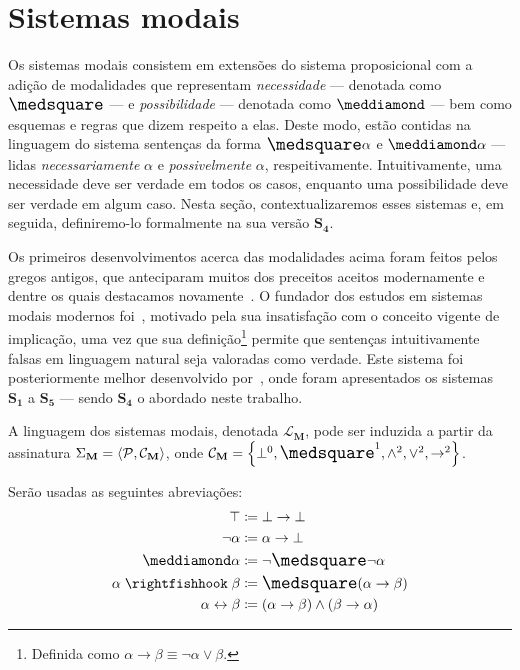 \section{Sistemas modais}
    Os sistemas modais consistem em extensões do sistema proposicional com a adição de modalidades que representam \emph{necessidade} --- denotada como $\nec$ --- e \emph{possibilidade} --- denotada como $\pos$ --- bem como esquemas e regras que dizem respeito a elas. Deste modo, estão contidas na linguagem do sistema sentenças da forma $\nec\alpha$ e $\pos\alpha$ --- lidas \emph{necessariamente} $\alpha$ e \emph{possivelmente} $\alpha$, respeitivamente. Intuitivamente, uma necessidade deve ser verdade em todos os casos, enquanto uma possibilidade deve ser verdade em algum caso. Nesta seção, contextualizaremos esses sistemas e, em seguida, definiremo-lo formalmente na sua versão $\mathbf{S_4}$.

    Os primeiros desenvolvimentos acerca das modalidades acima foram feitos pelos gregos antigos, que anteciparam muitos dos preceitos aceitos modernamente e dentre os quais destacamos novamente~\cite{Aristotle}. O fundador dos estudos em sistemas modais modernos foi~\cite{Lewis}, motivado pela sua insatisfação com o conceito vigente de implicação, uma vez que sua definição\footnote{Definida como $\alpha\to\beta\equiv\neg\alpha\vee\beta$.} permite que sentenças intuitivamente falsas em linguagem natural seja valoradas como verdade. Este sistema foi posteriormente melhor desenvolvido por~\cite{Langford}, onde foram apresentados os sistemas $\mathbf{S_1}$ a $\mathbf{S_5}$ --- sendo $\mathbf{S_4}$ o abordado neste trabalho.

    \begin{definition}
        A linguagem dos sistemas modais, denotada $\mathcal{L}_\mathbf{M}$, pode ser induzida a partir da assinatura $\Sigma_\mathbf{M}=\langle\mathcal{P},\mathcal{C}_\mathbf{M}\rangle$, onde $\mathcal{C}_\mathbf{M}=\set{\bot^0,\nec^1,\wedge^2,\vee^2,\to^2}$.
    \end{definition}

    \begin{notation}
        Serão usadas as seguintes abreviações:
        \begin{align*}
            \top&\coloneqq\bot\to\bot\\
            \neg\alpha&\coloneqq\alpha\to\bot\\
            \pos\alpha&\coloneqq\neg\nec\neg\alpha\\
            \alpha\strictif\beta&\coloneqq\nec(\alpha\to\beta)\\
            \alpha\leftrightarrow\beta&\coloneqq(\alpha\to\beta)\wedge(\beta\to\alpha)
        \end{align*}
    \end{notation}

